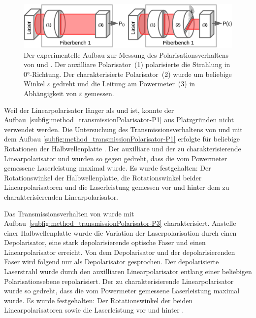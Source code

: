 \documentclass[a4paper,12pt,twoside,parskip=no,headsepline,open=right,ngerman,export]{scrreprt}
\begin{document}
            \begin{figure}[!b]
                \centering
                \includegraphics[width=\textwidth]{img/aufbau_linearpolarisator_polarisation.pdf}
                \caption[Polarisationsverhalten von Linearpolarisatoren]{Der experimentelle Aufbau zur Messung des Polarisationsverhaltens von  und . Der auxilliare Polarisator~(1) polarisierte die Strahlung in 0°-Richtung. Der charakterisierte Polarisator~(2) wurde um beliebige Winkel $\varepsilon$ gedreht und die Leitung am Powermeter~(3) in Abhängigkeit von $\varepsilon$ gemessen.}
                \label{fig:method_polarisationPolarisator}
            \end{figure}
            
            Weil der Linearpolarisator  länger als  und  ist, konnte der Aufbau~\ref{subfig:method_transmissionPolarisator-P1} aus Platzgründen nicht verwendet werden. Die Untersuchung des Transmissionsverhaltens von  und  mit dem Aufbau \ref{subfig:method_transmissionPolarisator-P1} erfolgte für beliebige Rotationen der Halbwellenplatte . Der auxilliare und der zu charakterisierende Linearpolarisator  und  wurden so gegen  gedreht, dass die vom Powermeter gemessene Laserleistung maximal wurde. Es wurde festgehalten: Der Rotationswinkel der Halbwellenplatte, die Rotationswinkel beider Linearpolarisatoren und die Laserleistung gemessen vor und hinter dem zu charakterisierenden Linearpolarisator.
            
            Das Transmissionsverhalten von  wurde mit Aufbau~\ref{subfig:method_transmissionPolarisator-P3} charakterisiert. Anstelle einer Halbwellenplatte wurde die Variation der Laserpolarisation durch einen Depolarisator, eine stark depolarisierende optische Faser und einen Linearpolarisator erreicht. Von dem Depolarisator und der depolarisierenden Faser wird folgend nur als Depolarisator gesprochen. Der depolarisierte Laserstrahl wurde durch den auxilliaren Linearpolarisator  entlang einer beliebigen Polarisationsebene repolarisiert. Der zu charakterisierende Linearpolarisator  wurde so gedreht, dass die vom Powermeter gemessene Laserleistung maximal wurde. Es wurde festgehalten: Der Rotationswinkel der beiden Linearpolarisatoren sowie die Laserleistung vor und hinter .
            
\end{document}
